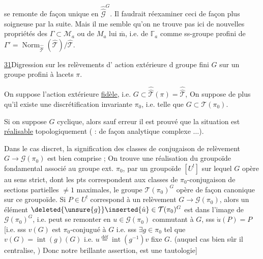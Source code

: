 se remonte de façon unique en
$\widehat{\widehat{\mathcal G}}^{G}$.
Il faudrait réexaminer ceci de façon plus soigneuse par la suite.
Mais il me semble qu'on ne trouve pas ici de nouvelles propriétés des
$\Gamma\subset\mathcal M_a$ ou de
$M_a$ lui $\overline{\mathrm m}$, i.e. de
$\mathbb{\Gamma}_a$ comme ss-groupe profini de
$\Gamma'=\operatorname{Norm}_{\widehat{\widehat{\mathcal T}}}
(\widehat{\mathcal T})/\widehat{\mathcal T}$.

\uline{31}\quad Digression sur les relèvements
d' action extérieure
d groupe fini $G$ sur un
groupe profini à lacets $\pi$.

On suppose l'action extérieure \uline{fidèle},
i.e. $G\subset\widehat{\widehat{\mathcal T}}(\pi)
=\widehat{\widehat{\mathcal T}}$,
On suppose de plus qu'il existe une discrétification
invariante $\pi_0$, i.e. telle que
$G\subset\mathcal T(\pi_0)$.

Si on suppose $G$ cyclique, alors sauf
erreur il est prouvé que la situation est
\uline{réalisable} topologiquement ( :
\uline{} de façon analytique complexe $\ldots$).

Dans le cas discret, la signification des classes de
conjugaison de relèvement
$G\longrightarrow\mathcal G(\pi_0)$ est bien comprise ;
On trouve une  réalisation
 du groupoïde fondamental
associé au
groupe ext. $\pi_0$, par un groupoïde  $[U^{!}]$
sur lequel $G$ opère au sens strict, dont les pts
correspondent aux classes de $\pi_0$-conjugaison de sections
partielles $\ne1$ maximales, le groupe
$\mathcal T(\pi_0)^G$
opère de façon  canonique sur ce groupoïde.
Si $P\in U^{!}$ correspond à un relèvement
$G\longrightarrow\mathcal G(\pi_0)$, alors
un élément $\deleted{\unsure{g}}\inserted{\dot u}\in
\mathcal T(\pi_0)^G$ est dans l'image de
$\mathcal G(\pi_0)^G$, i.e. peut se remonter en
$u\in\mathcal G(\pi_0)$ commutant à $G$, sss
$\dot u(P)=P$ [i.e. sss
$v(G)$ est $\pi_0$-conjugué à $G$
i.e. sss $\exists g\in\pi_0$ tel que
$v(G)=\operatorname{int}(g)(G)$
i.e. 
$u\overset{\text{déf}}{=}\operatorname{int}(g^{-1})v$ fixe $G$.
 (auquel cas bien sûr il centralise,
)
Donc notre brillante assertion, est une tautologie]

